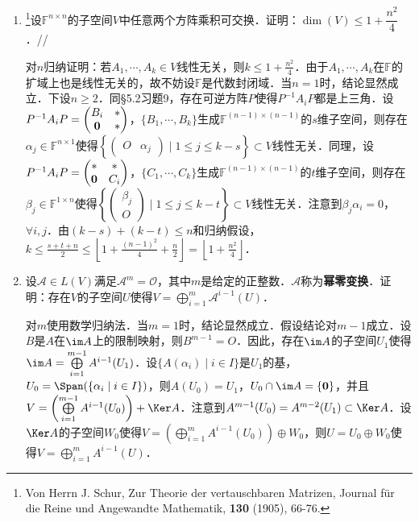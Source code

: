\begin{enumerate}
\item \footnote{Von Herrn J. Schur, Zur Theorie der vertauschbaren Matrizen, Journal f\"ur die Reine und Angewandte Mathematik, {\bf 130} (1905), 66-76.}设$\mathbb{F}^{n\times n}$的子空间$V$中任意两个方阵乘积可交换．证明：$\dim(V)\le 1+\dfrac{n^2}{4}$．//

对$n$归纳证明：若$A_1,\cdots,A_k\in V$线性无关，则$k\le 1+\frac{n^2}{4}$．由于$A_1,\cdots,A_k$在$\mathbb{F}$的扩域上也是线性无关的，故不妨设$\mathbb{F}$是代数封闭域．当$n=1$时，结论显然成立．下设$n\ge 2$．同\S5.2习题9，存在可逆方阵$P$使得$P^{-1}A_iP$都是上三角．设$P^{-1}A_iP=\begin{pmatrix}B_i&* \\ {\bf 0}&*\end{pmatrix}$，$\{B_1,\cdots,B_k\}$生成$\mathbb{F}^{(n-1)\times(n-1)}$的$s$维子空间，则存在$\alpha_j\in\mathbb{F}^{n\times 1}$使得$\left\{\begin{pmatrix}O&\alpha_j\end{pmatrix}\mid 1\le j\le k-s\right\}\subset V$线性无关．同理，设$P^{-1}A_iP=\begin{pmatrix}*&* \\ {\bf 0}&C_i\end{pmatrix}$，$\{C_1,\cdots,C_k\}$生成$\mathbb{F}^{(n-1)\times(n-1)}$的$t$维子空间，则存在$\beta_j\in\mathbb{F}^{1\times n}$使得$\left\{\begin{pmatrix}\beta_j \\ O\end{pmatrix}\mid 1\le j\le k-t\right\}\subset V$线性无关．注意到$\beta_j\alpha_i=0$，$\forall i,j$．由$(k-s)+(k-t)\le n$和归纳假设，$k\le\frac{s+t+n}{2}\le\left\lfloor 1+\frac{(n-1)^2}{4}+\frac{n}{2}\right\rfloor=\left\lfloor 1+\frac{n^2}{4}\right\rfloor$．

\item 设$\mathcal{A}\in L(V)$满足$\mathcal{A}^m=\mathcal{O}$，其中$m$是给定的正整数．$\mathcal{A}$称为{\bf 幂零变换}．证明：存在$V$的子空间$U$使得$V=\bigoplus\limits_{i=1}^m\mathcal{A}^{i-1}(U)$．

对$m$使用数学归纳法．当$m=1$时，结论显然成立．假设结论对$m-1$成立．设$B$是$A$在$\im A$上的限制映射，则$B^{m-1}=O$．因此，存在$\im A$的子空间$U_1$使得$\im A=\bigoplus\limits_{i=1}^{m-1}A^{i-1}(U_1)$．设$\{A(\alpha_i)\mid i\in I\}$是$U_1$的基，$U_0=\Span(\{\alpha_i\mid i\in I\})$，则$A(U_0)=U_1$，$U_0\cap\im A=\{{\bf 0}\}$，并且$V=\left(\bigoplus\limits_{i=1}^{m-1}A^{i-1}(U_0)\right)+\Ker A$．注意到$A^{m-1}(U_0)=A^{m-2}(U_1)\subset\Ker A$．设$\Ker A$的子空间$W_0$使得$V=\left(\bigoplus\limits_{i=1}^mA^{i-1}(U_0)\right)\oplus W_0$，则$U=U_0\oplus W_0$使得$V=\bigoplus\limits_{i=1}^mA^{i-1}(U)$．
\end{enumerate}

